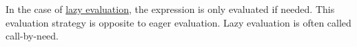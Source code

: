 In the case of \href{https://en.wikipedia.org/wiki/Lazy_evaluation}{lazy evaluation}, the expression is only evaluated if needed. This evaluation strategy is opposite to eager evaluation. Lazy evaluation is often called call-by-need.